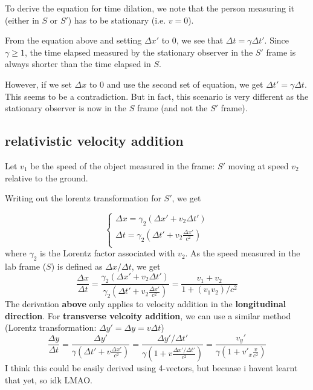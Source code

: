 To derive the equation for time dilation, we note that the person measuring it (either in $S$ or $S'$) has to be stationary (i.e. $v=0$).

From the equation above and setting $\Delta x'$ to 0, we see that $\Delta t=\gamma \Delta t'$. Since $\gamma\geq 1$, the time elapsed measured by the stationary observer in the $S'$ frame is always shorter than the time elapsed in $S$. 

However, if we set $\Delta x$ to 0 and use the second set of equation, we get $\Delta t'=\gamma \Delta t$. This seems to be a contradiction. But in fact, this scenario is very different as the stationary observer is now in the $S$ frame (and not the $S'$ frame).

\subsection{relativistic velocity addition}
Let $v_1$ be the speed of the object measured in the frame: $S'$ moving at speed $v_2$ relative to the ground.

Writing out the lorentz transformation for $S'$, we get 

\begin{equation}
    \begin{cases}
        \Delta x= \gamma_2 (\Delta x'+v_2 \Delta t')\\
        \Delta t = \gamma_2 (\Delta t'+v_2 \frac{\Delta x'}{c^2})\\
    \end{cases}
\end{equation}
where $\gamma_2$ is the Lorentz factor associated with $v_2$.
As the speed measured in the lab frame ($S$) is defined as $\Delta x/\Delta t$, we get 
\begin{equation}
    \frac{\Delta x}{\Delta t}= \frac{\gamma_2 (\Delta x'+v_2 \Delta t')}{\gamma_2 (\Delta t'+v_2 \frac{\Delta x'}{c^2})} = \frac{v_1+v_2}{1+(v_1 v_2)/c^2}
\end{equation}
The derivation \textbf{above} only applies to velocity addition in the \textbf{longitudinal direction}. For \textbf{transverse velcoity addition}, we can use a similar method (Lorentz transformation: $\Delta y'=\Delta y= v \Delta t $)
\begin{equation}
    \frac{\Delta y}{\Delta t}=\frac{\Delta y'}{\gamma (\Delta t'+v \frac{\Delta x'}{c^2})} =\frac{\Delta y'/\Delta t'}{\gamma (1 +v \frac{\Delta x'/\Delta t'}{c^2})}= \frac{v_y'}{\gamma (1+v'_x\frac{v}{c^2})}
\end{equation}
I think this could be easily derived using 4-vectors, but becuase i havent learnt that yet, so idk LMAO. 

